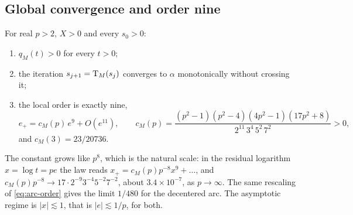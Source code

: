 \subsection{Global convergence and order nine}

\begin{theorem}\label{thm:mean}
For real $p>2$, $X>0$ and every $s_0>0$:
\begin{enumerate}[label=\textup{(\roman*)}]
\item $q_M(t)>0$ for every $t>0$;
\item the iteration $s_{j+1}=\mathrm{T}_M(s_j)$ converges to $\alpha$ monotonically without crossing it;
\item the local order is exactly nine,
\begin{equation}\label{eq:cM}
e_+=c_M(p)\,e^{9}+O(e^{11}),\qquad
c_M(p)=\frac{(p^{2}-1)(p^{2}-4)(4p^{2}-1)(17p^{2}+8)}{2^{11}\,3^{4}\,5^{2}\,7^{2}}>0 ,
\end{equation}
and $c_M(3)=23/20736$.
\end{enumerate}
\end{theorem}

The constant grows like $p^{8}$, which is the natural scale: in the residual logarithm $x=\log t=pe$ the
law reads $x_+=c_M(p)p^{-8}x^{9}+\dots$, and $c_M(p)p^{-8}\to17\cdot2^{-9}3^{-4}5^{-2}7^{-2}$, about
$3.4\times10^{-7}$, as $p\to\infty$. The same rescaling of \eqref{eq:arc-order} gives the limit $1/480$
for the decentered arc. The asymptotic regime is $|x|\lesssim1$, that is $|e|\lesssim1/p$, for both.

